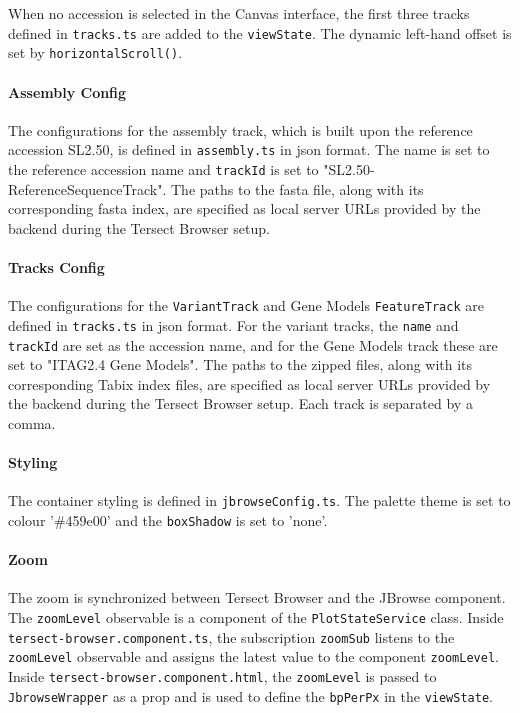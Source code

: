 \documentclass[12pt]{article}
\begin{document}
When no accession is selected in the Canvas interface, the first three tracks defined in \verb +tracks.ts+ are added to the \verb +viewState+. The dynamic left-hand offset is set by \verb +horizontalScroll()+. 


\paragraph{Assembly Config}

The configurations for the assembly track, which is built upon the reference accession SL2.50, is defined in \verb +assembly.ts+ in json format. The name is set to the reference accession name and \verb +trackId+ is set to "SL2.50-ReferenceSequenceTrack". The paths to the fasta file, along with its corresponding fasta index, are specified as local server URLs provided by the backend during the Tersect Browser setup. 

\paragraph{Tracks Config} 
The configurations for the \verb +VariantTrack+ and Gene Models \verb +FeatureTrack+ are defined in \verb +tracks.ts+ in json format. For the variant tracks, the \verb +name+ and \verb +trackId+ are set as the accession name, and for the Gene Models track these are set to "ITAG2.4 Gene Models".  The paths to the zipped files, along with its corresponding Tabix index files, are specified as local server URLs provided by the backend during the Tersect Browser setup. Each track is separated by a comma. 

\paragraph{Styling}
The container styling is defined in \verb +jbrowseConfig.ts+. The palette theme is set to colour '\#459e00' and the \verb +boxShadow+ is set to 'none'. 

\paragraph{Zoom} 
The zoom is synchronized between Tersect Browser and the JBrowse component. The \verb +zoomLevel+ observable is a component of the \verb +PlotStateService+ class. Inside \verb +tersect-browser.component.ts+, the subscription \verb +zoomSub+ listens to the \verb +zoomLevel+ observable and assigns the latest value to the component \verb +zoomLevel+. Inside \verb +tersect-browser.component.html+, the \verb +zoomLevel+ is passed to \verb +JbrowseWrapper+ as a prop and is used to define the \verb +bpPerPx+ in the \verb +viewState+. 
\end{document}
